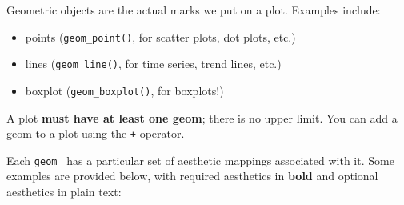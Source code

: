 \documentclass[]{book}
\providecommand{\tightlist}{%
  \setlength{\itemsep}{0pt}\setlength{\parskip}{0pt}}
\begin{document}
Geometric objects are the actual marks we put on a plot. Examples include:

\begin{itemize}
\tightlist
\item
  points (\texttt{geom\_point()}, for scatter plots, dot plots, etc.)
\item
  lines (\texttt{geom\_line()}, for time series, trend lines, etc.)
\item
  boxplot (\texttt{geom\_boxplot()}, for boxplots!)
\end{itemize}

A plot \textbf{must have at least one geom}; there is no upper limit. You can add a geom to a plot using the \texttt{+} operator.

Each \texttt{geom\_} has a particular set of aesthetic mappings associated with it. Some examples are provided below,
with required aesthetics in \textbf{bold} and optional aesthetics in plain text:
\end{document}
